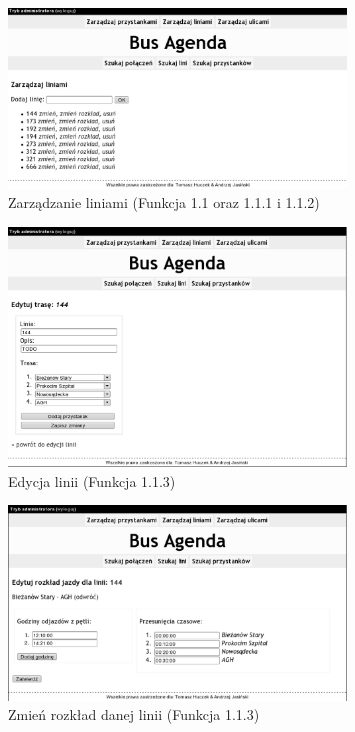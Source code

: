 \begin{figure}[!htp]
    \centering
    \includegraphics[width=0.8\textwidth]{./img/screens/manageLines_main.eps}
    \caption{Zarządzanie liniami (Funkcja 1.1 oraz 1.1.1 i 1.1.2)}
    \label{fig:linesMgtMain}
\end{figure}
\begin{figure}[!htp]
    \centering
    \includegraphics[width=0.8\textwidth]{./img/screens/manageLine.eps}
    \caption{Edycja linii (Funkcja 1.1.3)}
    \label{fig:lineMgt}
\end{figure}
\begin{figure}[!htp]
    \centering
    \includegraphics[width=0.8\textwidth]{./img/screens/manageLine_tt.eps}
    \caption{Zmień rozkład danej linii (Funkcja 1.1.3)}
    \label{fig:lineTTMgt}
\end{figure}
